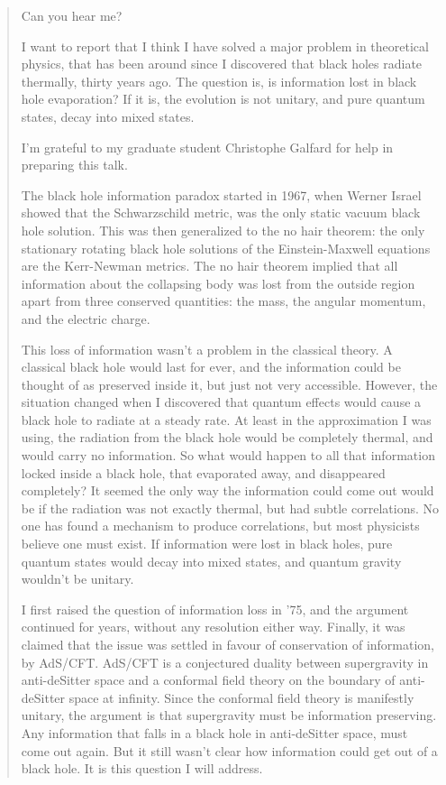 \documentclass{article}
\begin{document}
\begin{quote}
Can you hear me?

I want to report that I think I have solved a major problem in
theoretical physics, that has been around since I discovered that black
holes radiate thermally, thirty years ago. The question is, is
information lost in black hole evaporation? If it is, the evolution is
not unitary, and pure quantum states, decay into mixed states.

I'm grateful to my graduate student Christophe Galfard for help in
preparing this talk.

The black hole information paradox started in 1967, when Werner Israel
showed that the Schwarzschild metric, was the only static vacuum black
hole solution. This was then generalized to the no hair theorem: the
only stationary rotating black hole solutions of the Einstein-Maxwell
equations are the Kerr-Newman metrics. The no hair theorem implied that
all information about the collapsing body was lost from the outside
region apart from three conserved quantities: the mass, the angular
momentum, and the electric charge.

This loss of information wasn't a problem in the classical theory. A
classical black hole would last for ever, and the information could be
thought of as preserved inside it, but just not very accessible.
However, the situation changed when I discovered that quantum effects
would cause a black hole to radiate at a steady rate. At least in the
approximation I was using, the radiation from the black hole would be
completely thermal, and would carry no information. So what would happen
to all that information locked inside a black hole, that evaporated
away, and disappeared completely? It seemed the only way the information
could come out would be if the radiation was not exactly thermal, but
had subtle correlations. No one has found a mechanism to produce
correlations, but most physicists believe one must exist. If information
were lost in black holes, pure quantum states would decay into mixed
states, and quantum gravity wouldn't be unitary.

I first raised the question of information loss in '75, and the argument
continued for years, without any resolution either way. Finally, it was
claimed that the issue was settled in favour of conservation of
information, by AdS/CFT. AdS/CFT is a conjectured duality between
supergravity in anti-deSitter space and a conformal field theory on the
boundary of anti-deSitter space at infinity. Since the conformal field
theory is manifestly unitary, the argument is that supergravity must be
information preserving. Any information that falls in a black hole in
anti-deSitter space, must come out again. But it still wasn't clear how
information could get out of a black hole. It is this question I will
address.


\end{quote}
\end{document}
